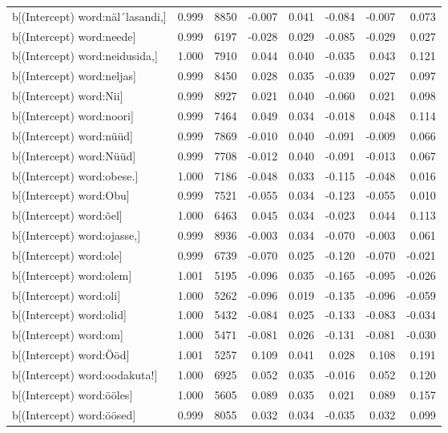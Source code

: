 \begin{longtable}{lrrrrrrr}
  b[(Intercept) word:näl´lasandi,] & 0.999 & 8850 & -0.007 & 0.041 & -0.084 & -0.007 & 0.073 \\ 
  b[(Intercept) word:neede] & 0.999 & 6197 & -0.028 & 0.029 & -0.085 & -0.029 & 0.027 \\ 
  b[(Intercept) word:neidusida,] & 1.000 & 7910 & 0.044 & 0.040 & -0.035 & 0.043 & 0.121 \\ 
  b[(Intercept) word:neljas] & 0.999 & 8450 & 0.028 & 0.035 & -0.039 & 0.027 & 0.097 \\ 
  b[(Intercept) word:Nii] & 0.999 & 8927 & 0.021 & 0.040 & -0.060 & 0.021 & 0.098 \\ 
  b[(Intercept) word:noori] & 0.999 & 7464 & 0.049 & 0.034 & -0.018 & 0.048 & 0.114 \\ 
  b[(Intercept) word:nüüd] & 0.999 & 7869 & -0.010 & 0.040 & -0.091 & -0.009 & 0.066 \\ 
  b[(Intercept) word:Nüüd] & 0.999 & 7708 & -0.012 & 0.040 & -0.091 & -0.013 & 0.067 \\ 
  b[(Intercept) word:obese.] & 1.000 & 7186 & -0.048 & 0.033 & -0.115 & -0.048 & 0.016 \\ 
  b[(Intercept) word:Obu] & 0.999 & 7521 & -0.055 & 0.034 & -0.123 & -0.055 & 0.010 \\ 
  b[(Intercept) word:õel] & 1.000 & 6463 & 0.045 & 0.034 & -0.023 & 0.044 & 0.113 \\ 
  b[(Intercept) word:ojasse,] & 0.999 & 8936 & -0.003 & 0.034 & -0.070 & -0.003 & 0.061 \\ 
  b[(Intercept) word:ole] & 0.999 & 6739 & -0.070 & 0.025 & -0.120 & -0.070 & -0.021 \\ 
  b[(Intercept) word:olem] & 1.001 & 5195 & -0.096 & 0.035 & -0.165 & -0.095 & -0.026 \\ 
  b[(Intercept) word:oli] & 1.000 & 5262 & -0.096 & 0.019 & -0.135 & -0.096 & -0.059 \\ 
  b[(Intercept) word:olid] & 1.000 & 5432 & -0.084 & 0.025 & -0.133 & -0.083 & -0.034 \\ 
  b[(Intercept) word:om] & 1.000 & 5471 & -0.081 & 0.026 & -0.131 & -0.081 & -0.030 \\ 
  b[(Intercept) word:Ööd] & 1.001 & 5257 & 0.109 & 0.041 & 0.028 & 0.108 & 0.191 \\ 
  b[(Intercept) word:oodakuta!] & 1.000 & 6925 & 0.052 & 0.035 & -0.016 & 0.052 & 0.120 \\ 
  b[(Intercept) word:ööles] & 1.000 & 5605 & 0.089 & 0.035 & 0.021 & 0.089 & 0.157 \\ 
  b[(Intercept) word:öösed] & 0.999 & 8055 & 0.032 & 0.034 & -0.035 & 0.032 & 0.099 \\ 

\end{longtable}
